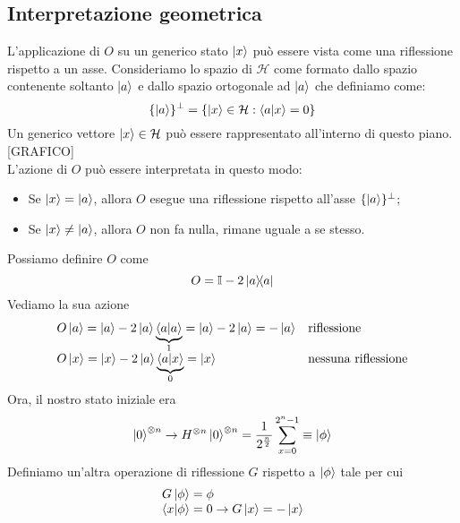 \subsection*{Interpretazione geometrica}
L'applicazione di $O$ su un generico stato $\ket x$ può essere vista come una riflessione rispetto a un asse. Consideriamo lo spazio di $\mathcal{H}$ come formato dallo spazio contenente soltanto $\ket a$ e dallo spazio ortogonale ad $\ket a$ che definiamo come:
\begin{equation*}
    \{\ket a\}^\perp=\{\ket x \in \mathcal{H}:\ip{a}{x}=0\}
\end{equation*}
Un generico vettore $\ket x \in \mathcal{H}$ può essere rappresentato all'interno di questo piano.
[GRAFICO]\\
L'azione di $O$ può essere interpretata in questo modo:
\begin{itemize}
    \item Se $\ket x = \ket a$, allora $O$ esegue una riflessione rispetto all'asse $\{\ket a\}^\perp$;
    \item Se $\ket x \neq \ket a$, allora $O$ non fa nulla, rimane uguale a se stesso.
\end{itemize}
Possiamo definire $O$ come
\begin{equation*}
    O=\mathbb{I}-2\op{a}{a}
\end{equation*}
Vediamo la sua azione
\begin{equation*}
        \begin{array}{ll}
            O\ket a=\ket a -2\ket{a}\underbrace{\ip{a}{a}}_{1}=\ket a - 2\ket{a} = -\ket{a} & \text{riflessione}\\
            O\ket x=\ket x -2\ket{a}\underbrace{\ip{a}{x}}_{0}= \ket{x} & \text{nessuna riflessione}
        \end{array}
\end{equation*}
Ora, il nostro stato iniziale era
\begin{equation*}
    \ket{0}^{\otimes n}\rightarrow H^{\otimes n}\ket{0}^{\otimes n}=\frac{1}{2^{\frac n2}}\sum_{x=0}^{2^n-1}\equiv \ket\phi
\end{equation*}
Definiamo un'altra operazione di riflessione $G$ rispetto a $\ket\phi$ tale per cui
\begin{equation*}
    \begin{array}{ll}
        G\ket\phi=\phi \\
        \ip{x}{\phi}=0 \rightarrow G\ket x=-\ket x
    \end{array}
\end{equation*}
